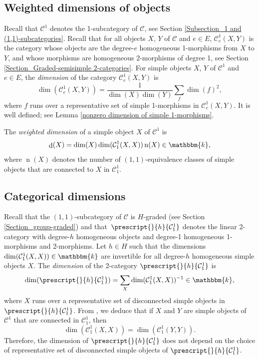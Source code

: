 \documentclass[a4paper, oneside]{amsart}
\DeclareMathOperator{\wdim}{d}
\numberwithin{equation}{subsection}
\theoremstyle{referencedlemma}
\theoremstyle{plain} %
\theoremstyle{remark}
\begin{document}
\subsection{Weighted dimensions of objects}\label{Weighted dimension}

Recall that $\mathcal{C}^1$ denotes the 1-subcategory of $\mathcal{C}$, see Section \ref{Subsection_1 and (1,1)-subcategories}. Recall that for all objects $X$, $Y$ of $\mathcal{C}$ and $e\in E$,  $\mathcal{C}_e^1(X,Y)$ is the category whose objects are the degree-$e$ homogeneous 1-morphisms from $X$ to $Y$, and whose morphisms are homogeneous 2-morphisms of degree 1, see Section \ref{Section_Graded-semisimple 2-categories}.  For simple objects $X$, $Y$ of $\mathcal{C}^1$ and $e\in E$, the \emph{dimension} of the category $\mathcal{C}_e^1(X,Y)$ is
$$
\dim(\mathcal{C}_e^1(X,Y)) = \frac{1}{\dim(X)\dim(Y)}\sum_{f} \dim(f)^2,
$$
where $f$ runs over a representative set of simple 1-morphisms in $\mathcal{C}_e^1(X,Y)$.  It is well defined; see Lemma \ref{nonzero dimension of simple 1-morphisms}.


The \emph{weighted dimension} of a simple object $X$ of $\mathcal{C}^1$ is
$$
\wdim(X) =\dim(X) \dim(\mathcal{C}^1_1(X,X))\operatorname{n}(X) \in \mathbbm{k},
$$
where $\operatorname{n}(X)$ denotes the number of $(1,1)$-equivalence classes of simple objects that are connected to $X$ in $\mathcal{C}^1_1$.  

\subsection{Categorical dimensions}\label{Dimensions of 2-categories}

Recall that the $(1,1)$-subcategory of $\mathcal{C}$ is $H$-graded (see Section \ref{Section_group-graded}) and that~$\prescript{}{h}{\mathcal{C}_1^1}$ denotes the linear 2-category with degree-$h$ homogeneous objects and degree-1 homogeneous \mbox{1-mor}\-phisms and 2-morphisms. Let $h\in H$ such that the dimensions $\dim(\mathcal{C}_1^1(X,X))\in \mathbbm{k}$ are invertible for all degree-$h$ homogeneous simple objects $X$.  The \emph{dimension} of the 2-category $\prescript{}{h}{\mathcal{C}_1^1}$ is 
$$
\dim(\prescript{}{h}{\mathcal{C}_1^1}) = \sum_{X}\dim(\mathcal{C}_1^1(X,X))^{-1}\in \mathbbm{k},
$$
where $X$ runs over a representative set of disconnected simple objects in $\prescript{}{h}{\mathcal{C}^1_1}$. From \cite[Proposition~1.2.27]{douglas_fusion_2018}, we deduce that if $X$ and $Y$ are simple objects of $\mathcal{C}^1$ that are connected in $\mathcal{C}_1^1$, then
$$
\dim(\mathcal{C}_1^1(X,X)) = \dim(\mathcal{C}_1^1(Y,Y)).
$$
Therefore, the dimension of $\prescript{}{h}{\mathcal{C}_1^1}$ does not depend on the choice of representative set of disconnected simple objects of $\prescript{}{h}{\mathcal{C}_1^1}$. 
\end{document}
